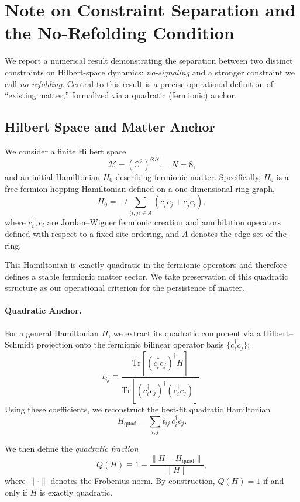 \section*{Note on Constraint Separation and the No-Refolding Condition}

We report a numerical result demonstrating the separation between two distinct constraints
on Hilbert-space dynamics: \emph{no-signaling} and a stronger constraint we call
\emph{no-refolding}. Central to this result is a precise operational definition of
``existing matter,'' formalized via a quadratic (fermionic) anchor.

\subsection*{Hilbert Space and Matter Anchor}

We consider a finite Hilbert space
\[
\mathcal{H} = (\mathbb{C}^2)^{\otimes N}, \quad N = 8,
\]
and an initial Hamiltonian $H_0$ describing fermionic matter.
Specifically, $H_0$ is a free-fermion hopping Hamiltonian defined on a one-dimensional
ring graph,
\[
H_0 = -t \sum_{\langle i,j\rangle \in A} \left( c_i^\dagger c_j + c_j^\dagger c_i \right),
\]
where $c_i^\dagger, c_i$ are Jordan--Wigner fermionic creation and annihilation operators
defined with respect to a fixed site ordering, and $A$ denotes the edge set of the ring.

This Hamiltonian is exactly quadratic in the fermionic operators and therefore defines
a stable fermionic matter sector. We take preservation of this quadratic structure as
our operational criterion for the persistence of matter.

\paragraph{Quadratic Anchor.}
For a general Hamiltonian $H$, we extract its quadratic component via a Hilbert--Schmidt
projection onto the fermionic bilinear operator basis $\{c_i^\dagger c_j\}$:
\[
t_{ij} \equiv
\frac{\mathrm{Tr}\!\left[(c_i^\dagger c_j)^\dagger H\right]}
     {\mathrm{Tr}\!\left[(c_i^\dagger c_j)^\dagger (c_i^\dagger c_j)\right]} .
\]
Using these coefficients, we reconstruct the best-fit quadratic Hamiltonian
\[
H_{\mathrm{quad}} = \sum_{i,j} t_{ij}\, c_i^\dagger c_j .
\]

We then define the \emph{quadratic fraction}
\[
Q(H) \equiv 1 - \frac{\|H - H_{\mathrm{quad}}\|}{\|H\|},
\]
where $\|\cdot\|$ denotes the Frobenius norm. By construction,
$Q(H)=1$ if and only if $H$ is exactly quadratic.

